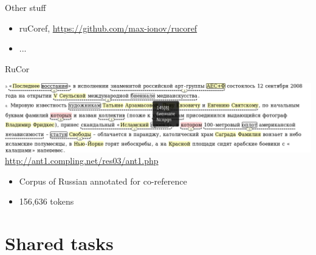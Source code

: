 \documentclass[dvipsnames, 10pt, compress]{beamer}
\begin{document}
\begin{frame}{Other stuff}

\begin{itemize}
   \item ruCoref, \url{https://github.com/max-ionov/rucoref}
   \item ... 
\end{itemize}

\end{frame}

\begin{frame}{RuCor}

\begin{center}
\includegraphics[width=\textwidth]{graphics/rucoref-pic.png} \\
\url{http://ant1.compling.net/res03/ant1.php}
\end{center}


\begin{itemize}
  \item Corpus of Russian annotated for co-reference
  \item 156,636 tokens

\end{itemize}

\end{frame}


\section{Shared tasks}
\end{document}
